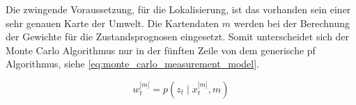 Die zwingende Voraussetzung, für die Lokalisierung, ist das vorhanden sein einer sehr genauen Karte der Umwelt. Die Kartendaten $m$ werden bei der Berechnung der Gewichte für die Zustandsprognosen eingesetzt. Somit unterscheidet sich der Monte Carlo Algorithmus nur in der fünften Zeile von dem generische \gls{pf} Algorithmus, siehe \autoref{eq:monte_carlo_measurement_model}. 

\begin{equation}
w^{\lbrack m \rbrack}_t = p(z_t \mid x^{\lbrack m \rbrack}_t, m) \label{eq:monte_carlo_measurement_model}
\end{equation}

%

